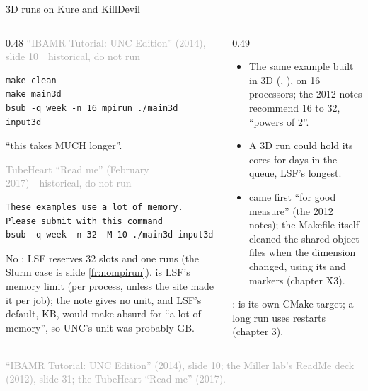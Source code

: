 \documentclass[aspectratio=169,11pt]{beamer}
\newcommand{\sourcecredit}[1]{\vfill\begin{flushright}\tiny\textcolor{DarkGray}{#1}\end{flushright}}
\newcommand{\hist}[1]{{\tiny\sffamily\textcolor{DarkGray}{#1\ \textbullet\ historical, do not run}}\par\nointerlineskip\vspace{0.3mm}}
\begin{document}
\begin{frame}[fragile]{3D runs on Kure and KillDevil}
\label{fr:kd3d}
\begin{columns}[T,onlytextwidth]
\begin{column}{0.48\textwidth}
\hist{``IBAMR Tutorial: UNC Edition'' (2014), slide 10}
\begin{lstlisting}[style=hist]
make clean
make main3d
bsub -q week -n 16 mpirun ./main3d input3d
\end{lstlisting}
\footnotesize ``this takes MUCH longer''.
\par\vspace{1mm}
\hist{TubeHeart ``Read me'' (February 2017)}
\begin{lstlisting}[style=hist]
These examples use a lot of memory. Please submit with this command
bsub -q week -n 32 -M 10 ./main3d input3d
\end{lstlisting}
\scriptsize No : LSF reserves 32 slots and one  runs (the Slurm case is slide \ref{fr:nompirun}).  is LSF's memory limit (per process, unless the site made it per job); the note gives no unit, and LSF's default, KB, would make  absurd for ``a lot of memory'', so UNC's unit was probably GB.
\end{column}
\begin{column}{0.49\textwidth}
\footnotesize
\begin{itemize}\setlength{\itemsep}{2pt}
  \item The same example built in 3D (, ), on 16 processors; the 2012 notes recommend 16 to 32, ``powers of 2''.
  \item A 3D run could hold its cores for days in the  queue, LSF's longest.
  \item {} came first ``for good measure'' (the 2012 notes); the Makefile itself cleaned the shared object files when the dimension changed, using its  and  markers (chapter X3).
\end{itemize}
\vspace{1mm}
:  is its own CMake target; a long run uses restarts (chapter 3).
\end{column}
\end{columns}
\sourcecredit{``IBAMR Tutorial: UNC Edition'' (2014), slide 10; the Miller lab's ReadMe deck (2012), slide 31; the TubeHeart ``Read me'' (2017).}
\end{frame}
\end{document}
